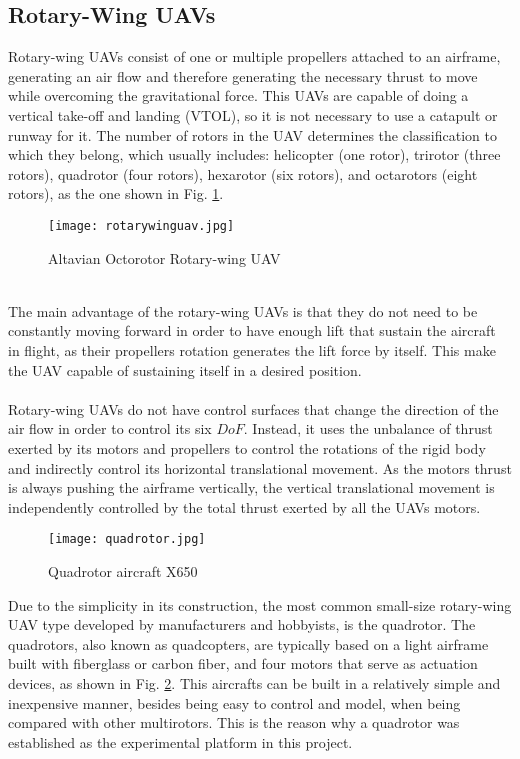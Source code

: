 \subsection{Rotary-Wing UAVs}
Rotary-wing UAVs consist of one or multiple propellers attached to an airframe, generating an air flow and therefore generating the necessary thrust to move while overcoming the gravitational force. This UAVs are capable of doing a vertical take-off and landing (VTOL), so it is not necessary to use a catapult or runway for it. The number of rotors in the UAV determines the classification to which they belong, which usually includes: helicopter (one rotor), trirotor (three rotors), quadrotor (four rotors), hexarotor (six rotors), and octarotors (eight rotors), as the one shown in Fig. \ref{fig:rotarywing}.
\begin{figure}[h]
\begin{center}
\texttt{[image: rotarywinguav.jpg]}    
\caption[Altavian Octorotor Rotary-wing UAV]{Altavian Octorotor Rotary-wing UAV\protect\footnotemark} 
\label{fig:rotarywing}
\end{center}
\end{figure}
\\The main advantage of the rotary-wing UAVs is that they do not need to be constantly moving forward in order to have enough lift that sustain the aircraft in flight, as their propellers rotation generates the lift force by itself. This make the UAV capable of sustaining itself in a desired position.
\\\\
Rotary-wing UAVs do not have control surfaces that change the direction of the air flow in order to control its six $DoF$. Instead, it uses the unbalance of thrust exerted by its motors and propellers to control the rotations of the rigid body and indirectly control its horizontal translational movement. As the motors thrust is always pushing the airframe vertically, the vertical translational movement is independently controlled by the total thrust exerted by all the UAVs motors.
\begin{figure}[H]
\begin{center}
\texttt{[image: quadrotor.jpg]}    
\caption[Quadrotor aircraft X650]{Quadrotor aircraft X650 \protect\footnotemark} 
\label{fig:quadrotarywing}
\end{center}
\end{figure}
Due to the simplicity in its construction, the most common small-size rotary-wing UAV type developed by manufacturers and hobbyists, is the quadrotor. The quadrotors, also known as quadcopters, are typically based on a light airframe built with fiberglass or carbon fiber, and four motors that serve as actuation devices, as shown in Fig. \ref{fig:quadrotarywing}. This aircrafts  can be built in a relatively simple and inexpensive manner, besides being easy to control and model, when being compared with other multirotors. This is the reason why a quadrotor was established as the experimental platform in this project.
\\\\
